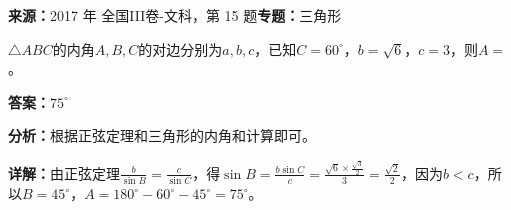 \begin{question}[points=5]
\textbf{来源：}2017 年 全国III卷-文科，第 15 题\quad \textbf{专题：}三角形\par
$\triangle ABC$的内角$A,B,C$的对边分别为$a,b,c$，已知$C=60^\circ$，$b=\sqrt{6}$，$c=3$，则$A=$        。
\fillin[{$75^\circ$}]
\begin{solution}
\textbf{答案：}$75^\circ$

\textbf{分析：}根据正弦定理和三角形的内角和计算即可。

\textbf{详解：}由正弦定理$\frac{b}{\sin B}=\frac{c}{\sin C}$，得$\sin B=\frac{b\sin C}{c}=\frac{\sqrt{6}\times\frac{\sqrt{3}}{2}}{3}=\frac{\sqrt{2}}{2}$，因为$b<c$，所以$B=45^\circ$，$A=180^\circ-60^\circ-45^\circ=75^\circ$。
\end{solution}
\end{question}

